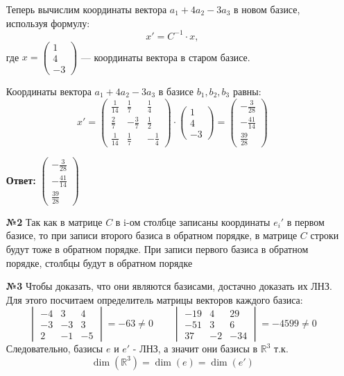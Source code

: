 \documentclass[a4paper]{article}
\renewcommand{\det}[1]{\begin{vmatrix} #1 \end{vmatrix}}
\newcommand{\RR}{\mathbb{R}}
\begin{document}
\begin{enumerate}
    
    Теперь вычислим координаты вектора \( a_1 + 4a_2 - 3a_3 \) в новом базисе, используя формулу:
    \[
    x' = C^{-1} \cdot x,
    \]
    где \( x = \begin{pmatrix} 1 \\ 4 \\ -3 \end{pmatrix} \) — координаты вектора в старом базисе.

    Координаты вектора \( a_1 + 4a_2 - 3a_3 \) в базисе \( b_1, b_2, b_3 \) равны:
    $$x' = \begin{pmatrix}
        \frac{1}{14} & \frac{1}{7} & \frac{1}{4} \\
        \frac{2}{7} & -\frac{3}{7} & \frac{1}{2} \\
       \frac{1}{14} & \frac{1}{7} & -\frac{1}{4}
       \end{pmatrix}\cdot \begin{pmatrix} 1 \\ 4 \\ -3 \end{pmatrix} = 
        \begin{pmatrix} 
        -\frac{3}{28} \\ 
        -\frac{41}{14} \\ 
        \frac{39}{28} 
        \end{pmatrix}
        $$

    \textbf{Ответ: } $\begin{pmatrix} 
        -\frac{3}{28} \\ 
        -\frac{41}{14} \\ 
        \frac{39}{28} 
        \end{pmatrix}$
    
    \item[\textbf{№2}]Так как в матрице $C$ в i-ом столбце записаны координаты $e_i'$ в первом базисе, то при записи второго базиса в обратном порядке, в матрице $C$ строки будут тоже в обратном порядке. При записи первого базиса в обратном порядке, столбцы будут в обратном порядке
    
    \item[\textbf{№3}]Чтобы доказать, что они являются базисами, достачно доказать их ЛНЗ. Для этого посчитаем определитель матрицы векторов каждого базиса:
    $$
    \det{
    -4 & 3 & 4 \\
    -3 & -3 & 3 \\
    2 & -1 & -5
    } = -63 \neq 0 
    \quad \quad
    \det{-19 & 4 & 29 \\
    -51 & 3 & 6 \\
    37 & -2 & -34} = -4599 \neq 0$$
    Следовательно, базисы $e$ и $e'$ - ЛНЗ, а значит они базисы в $\RR^3$ т.к. $$\dim(\RR^3) = \dim(e) = \dim(e')$$


\end{enumerate}
\end{document}
